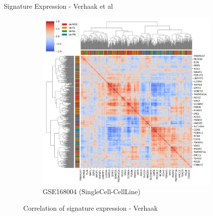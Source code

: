 \documentclass[aspectratio=169,9pt]{beamer}
\begin{document}
\begin{frame}{Signature Expression - Verhaak et al}
\begin{adjustwidth}{-5cm}{-5cm}
\begin{figure}
\begin{subfigure}[c]{0.48\textwidth}
                    \includegraphics[width=\textwidth]{mgg23_Corrplot_Ver}
                    \caption{GSE168004 (SingleCell-CellLine)}
                \end{subfigure}
                \caption{Correlation of signature expression - Verhaak}
            \end{figure}
        \end{adjustwidth}
    \end{frame}
\end{document}
